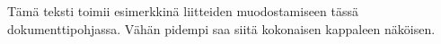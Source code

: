Tämä teksti toimii esimerkkinä liitteiden muodostamiseen tässä dokumenttipohjassa. Vähän pidempi saa siitä kokonaisen kappaleen näköisen.
